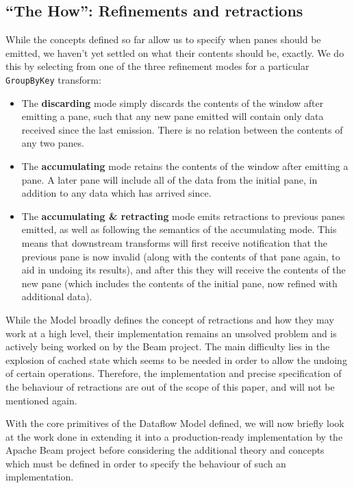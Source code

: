 
\subsection{``The How'': Refinements and retractions}

While the concepts defined so far allow us to specify when panes should be emitted, we haven't yet settled on what their contents should be, exactly.
We do this by selecting from one of the three refinement modes for a particular \verb|GroupByKey| transform:
\begin{itemize}
	\item The \textbf{discarding} mode simply discards the contents of the window after emitting a pane, such that any new pane emitted will contain only data received since the last emission. There is no relation between the contents of any two panes.
	\item The \textbf{accumulating} mode retains the contents of the window after emitting a pane. A later pane will include all of the data from the initial pane, in addition to any data which has arrived since.
	\item The \textbf{accumulating \& retracting} mode emits retractions to previous panes emitted, as well as following the semantics of the accumulating mode. This means that downstream transforms will first receive notification that the previous pane is now invalid (along with the contents of that pane again, to aid in undoing its results), and after this they will receive the contents of the new pane (which includes the contents of the initial pane, now refined with additional data). 
\end{itemize}


While the Model broadly defines the concept of retractions and how they may work at a high level, their implementation remains an unsolved problem and is actively being worked on by the Beam project.
The main difficulty lies in the explosion of cached state which seems to be needed in order to allow the undoing of certain operations.
Therefore, the implementation and precise specification of the behaviour of retractions are out of the scope of this paper, and will not be mentioned again.

With the core primitives of the Dataflow Model defined, we will now briefly look at the work done in extending it into a production-ready implementation by the Apache Beam project before considering the additional theory and concepts which must be defined in order to specify the behaviour of such an implementation.

